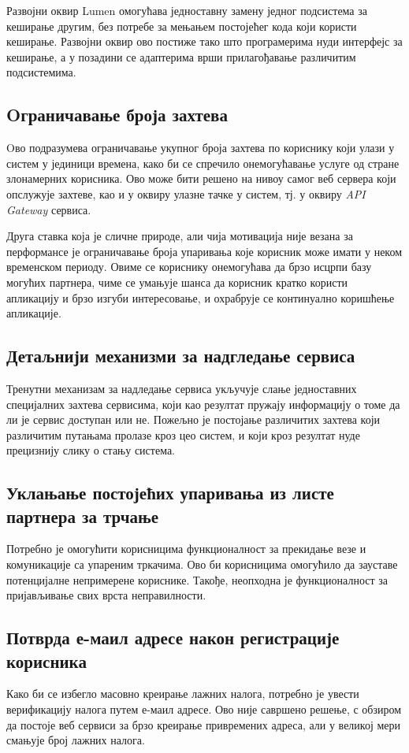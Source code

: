 \documentclass[12pt,oneside]{memoir}
\begin{document}
Развојни оквир Lumen омогућава једноставну замену једног подсистема за кеширање другим, без потребе за мењањем постојећег кода који користи кеширање. Развојни оквир ово постиже тако што програмерима нуди интерфејс за кеширање, а у позадини се адаптерима врши прилагођавање различитим подсистемима.

\subsection{Oграничавање броја захтева}
Oво подразумева ограничавање укупног броја захтева по кориснику који улази у систем у јединици времена, како би се спречило онемогућавање услуге од стране злонамерних корисника. Ово може бити решено на нивоу самог веб сервера који опслужује захтеве, као и у оквиру улазне тачке у систем, тј. у оквиру \textit{API Gateway} сервиса.

Друга ставка која је сличне природе, али чија мотивација није везана за перформансе је ограничавање броја упаривања које корисник може имати у неком временском периоду. Овиме се кориснику онемогућава да брзо исцрпи базу могућих партнера, чиме се умањује шанса да корисник кратко користи апликацију и брзо изгуби интересовање, и охрабрује се континуално коришћење апликације.

\subsection{Детаљнији механизми за надгледање сервиса}
Тренутни механизам за надледање сервиса укључује слање једноставних специјалних захтева сервисима, који као резултат пружају информацију о томе да ли је сервис доступан или не. Пожељно је постојање различитих захтева који различитим путањама пролазе кроз цео систем, и који кроз резултат нуде прецизнију слику о стању система.

\subsection{Уклањање постојећих упаривања из листе партнера за трчање}
Потребно је омогућити корисницима функционалност за прекидање везе и комуникације са упареним тркачима. Ово би корисницима омогућило да зауставе потенцијалне непримерене кориснике. Такође, неопходна је функционалност за пријављивање свих врста неправилности.

\subsection{Потврда е-маил адресе након регистрације корисника}
Како би се избегло масовно креирање лажних налога, потребно је увести верификацију налога путем е-маил адресе. Ово није савршено решење, с обзиром да постоје веб сервиси за брзо креирање привремених адреса, али у великој мери смањује број лажних налога.
\end{document}
